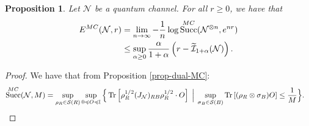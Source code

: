 \documentclass[a4paper,onecolumn,11pt,accepted=2025-10-01]{quantumarticle}
\newtheorem{prop}[theorem]{Proposition}
\DeclareMathOperator{\suc}{Succ}
\newcommand*{\cI}{\mathcal{I}}
\newcommand*{\dI}{\mathbb{I}}
\newcommand*{\cN}{\mathcal{N}}
\newcommand*{\cS}{\mathcal{S}}
\newcommand*{\tr}[1]{\mathrm{Tr}\left[#1\right]}
\newcommand*{\mle}{\preccurlyeq}
\begin{document}
\begin{prop}\label{prop:SCE-achiev}
Let  $\cN$ be a quantum channel. For all $r\ge 0$, we have  that
 \begin{align}
     E^{\rm{MC}}(\cN, r) &= \lim_{n\rightarrow \infty } - \frac{1}{n}\log \suc^{\rm{MC}}(\cN^{\otimes n}, e^{nr})  
     \\&\le \sup_{\alpha\ge 0}  \frac{\alpha}{1+\alpha}\left( r- \widetilde{\cI}_{1+\alpha}(\cN) \right). 
    \end{align}
\end{prop}

\begin{proof}
We have that from Proposition \ref{prop-dual-MC}:
\begin{align}
\suc^{\rm{MC}}(\cN, M) \notag
&= \sup_{\rho_R \in \cS(R)} \sup_{0 \mle O \mle \dI} \Big\{\, 
 \tr{\rho_R^{1/2} (J_{\cN})_{RB} \rho_R^{1/2} \cdot O} \;\Big|\; \sup_{\sigma_B \in \cS(B)} \tr{(\rho_R \otimes \sigma_B) O} \le \frac{1}{M} \Big\}.
\end{align}


\end{proof}
\end{document}

